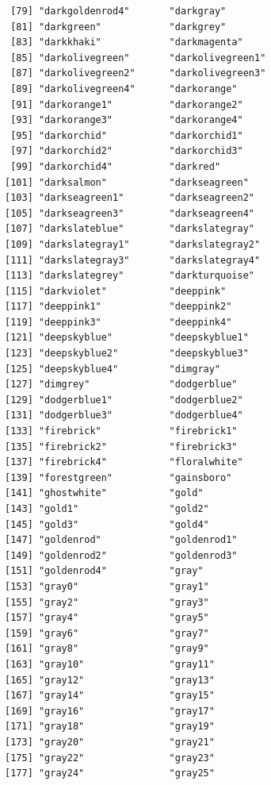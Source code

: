 \documentclass[a4paperpaper,]{article}
\begin{document}
\begin{verbatim}
 [79] "darkgoldenrod4"       "darkgray"            
 [81] "darkgreen"            "darkgrey"            
 [83] "darkkhaki"            "darkmagenta"         
 [85] "darkolivegreen"       "darkolivegreen1"     
 [87] "darkolivegreen2"      "darkolivegreen3"     
 [89] "darkolivegreen4"      "darkorange"          
 [91] "darkorange1"          "darkorange2"         
 [93] "darkorange3"          "darkorange4"         
 [95] "darkorchid"           "darkorchid1"         
 [97] "darkorchid2"          "darkorchid3"         
 [99] "darkorchid4"          "darkred"             
[101] "darksalmon"           "darkseagreen"        
[103] "darkseagreen1"        "darkseagreen2"       
[105] "darkseagreen3"        "darkseagreen4"       
[107] "darkslateblue"        "darkslategray"       
[109] "darkslategray1"       "darkslategray2"      
[111] "darkslategray3"       "darkslategray4"      
[113] "darkslategrey"        "darkturquoise"       
[115] "darkviolet"           "deeppink"            
[117] "deeppink1"            "deeppink2"           
[119] "deeppink3"            "deeppink4"           
[121] "deepskyblue"          "deepskyblue1"        
[123] "deepskyblue2"         "deepskyblue3"        
[125] "deepskyblue4"         "dimgray"             
[127] "dimgrey"              "dodgerblue"          
[129] "dodgerblue1"          "dodgerblue2"         
[131] "dodgerblue3"          "dodgerblue4"         
[133] "firebrick"            "firebrick1"          
[135] "firebrick2"           "firebrick3"          
[137] "firebrick4"           "floralwhite"         
[139] "forestgreen"          "gainsboro"           
[141] "ghostwhite"           "gold"                
[143] "gold1"                "gold2"               
[145] "gold3"                "gold4"               
[147] "goldenrod"            "goldenrod1"          
[149] "goldenrod2"           "goldenrod3"          
[151] "goldenrod4"           "gray"                
[153] "gray0"                "gray1"               
[155] "gray2"                "gray3"               
[157] "gray4"                "gray5"               
[159] "gray6"                "gray7"               
[161] "gray8"                "gray9"               
[163] "gray10"               "gray11"              
[165] "gray12"               "gray13"              
[167] "gray14"               "gray15"              
[169] "gray16"               "gray17"              
[171] "gray18"               "gray19"              
[173] "gray20"               "gray21"              
[175] "gray22"               "gray23"              
[177] "gray24"               "gray25"              

\end{verbatim}
\end{document}
